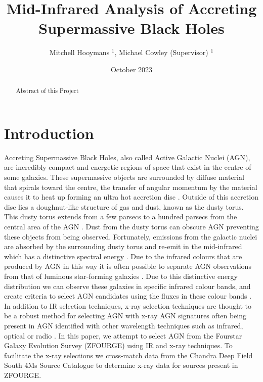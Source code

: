\documentclass[12pt]{iopart}
\date{October 2023}
\begin{document}
\title{Mid-Infrared Analysis of Accreting Supermassive Black Holes}
\author{Mitchell Hooymans $^1$, Michael Cowley (Supervisor) $^1$}
\address{$^1$ Queensland University of Technology, Brisbane, Australia, 4000}

\begin{abstract}
    Abstract of this Project
\end{abstract}

\ioptwocol
\section{Introduction}
Accreting Supermassive Black Holes, also called Active Galactic Nuclei (AGN), are incredibly compact and energetic regions of space that exist in the centre of some galaxies. These supermassive objects are surrounded by diffuse material that spirals toward the centre, the transfer of angular momentum by the material causes it to heat up forming an ultra hot accretion disc \cite{shakura_black_1973}. Outside of this accretion disc lies a doughnut-like structure of gas and dust, known as the dusty torus. This dusty torus extends from a few parsecs to a hundred parsecs from the central area of the AGN \cite{netzer_revisiting_2015}. Dust from the dusty torus can obscure AGN preventing these objects from being observed. Fortunately, emissions from the galactic nuclei are absorbed by the surrounding dusty torus and re-emit in the mid-infrared which has a distinctive spectral energy \cite{lyu_polar_2018}. Due to the infrared colours that are produced by AGN in this way it is often possible to separate AGN observations from that of luminous star-forming galaxies \cite{hickox_obscured_2018}.
Due to this distinctive energy distribution we can observe these galaxies in specific infrared colour bands, and create criteria to select AGN candidates using the fluxes in these colour bands \cite{lacy_obscured_2004, stern_midinfrared_2005, donley_identifying_2012, messias_new_2012}. In addition to IR selection techniques, x-ray selection techniques are thought to be a robust method for selecting AGN with x-ray AGN signatures often being present in AGN identified with other wavelength techniques such as infrared, optical or radio \cite{brandt_cosmic_2015}. In this paper, we attempt to select AGN from the Fourstar Galaxy Evolution Survey (ZFOURGE) \cite{straatman_fourstar_2016} using IR and x-ray techniques. To facilitate the x-ray selections we cross-match data from the Chandra Deep Field South 4Ms Source Catalogue \cite{xue_chandra_2011} to determine x-ray data for sources present in ZFOURGE. 
\end{document}
